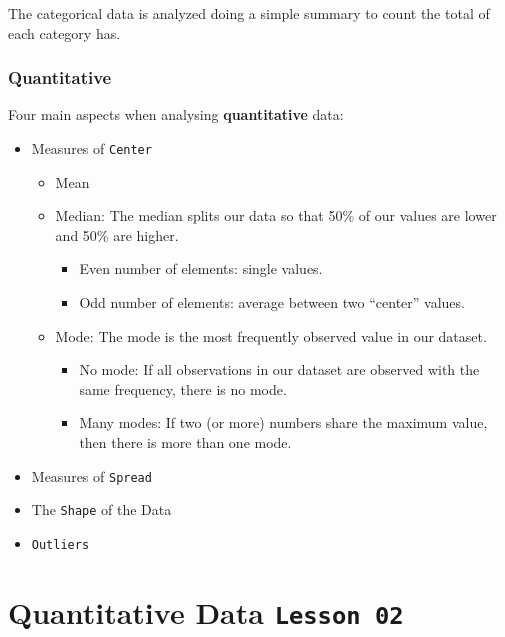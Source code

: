 \documentclass[]{book}
\providecommand{\tightlist}{%
  \setlength{\itemsep}{0pt}\setlength{\parskip}{0pt}}
\begin{document}
The categorical data is analyzed doing a simple summary to count the
total of each category has.

\subsubsection{Quantitative}\label{quantitative}

Four main aspects when analysing \textbf{quantitative} data:

\begin{itemize}
\tightlist
\item
  Measures of \texttt{Center}

  \begin{itemize}
  \tightlist
  \item
    Mean
  \item
    Median: The median splits our data so that 50\% of our values are
    lower and 50\% are higher.

    \begin{itemize}
    \tightlist
    \item
      Even number of elements: single values.
    \item
      Odd number of elements: average between two ``center'' values.
    \end{itemize}
  \item
    Mode: The mode is the most frequently observed value in our dataset.

    \begin{itemize}
    \tightlist
    \item
      No mode: If all observations in our dataset are observed with the
      same frequency, there is no mode.
    \item
      Many modes: If two (or more) numbers share the maximum value, then
      there is more than one mode.
    \end{itemize}
  \end{itemize}
\item
  Measures of \texttt{Spread}
\item
  The \texttt{Shape} of the Data
\item
  \texttt{Outliers}
\end{itemize}

\section{\texorpdfstring{Quantitative Data
\texttt{Lesson\ 02}}{Quantitative Data Lesson 02}}\label{quantitative-data-lesson-02}
\end{document}
